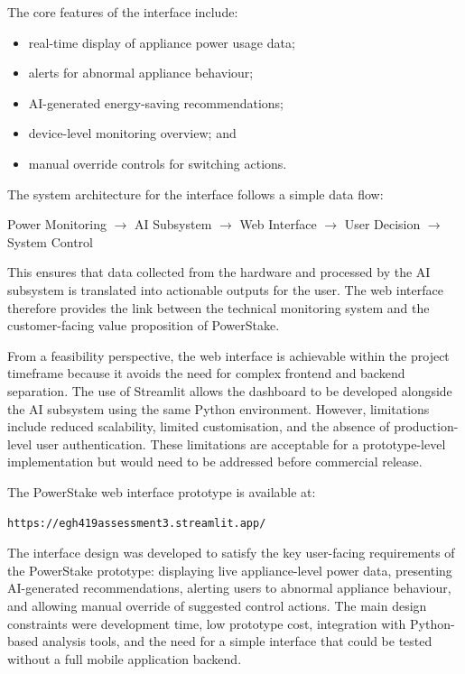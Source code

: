\documentclass[11pt, twoside, a4paper]{article}
\begin{document}
The core features of the interface include:
\begin{itemize}
    \item real-time display of appliance power usage data;
    \item alerts for abnormal appliance behaviour;
    \item AI-generated energy-saving recommendations;
    \item device-level monitoring overview; and
    \item manual override controls for switching actions.
\end{itemize}

The system architecture for the interface follows a simple data flow:

\begin{center}
Power Monitoring \(\rightarrow\) AI Subsystem \(\rightarrow\) Web Interface \(\rightarrow\) User Decision \(\rightarrow\) System Control
\end{center}

This ensures that data collected from the hardware and processed by the AI subsystem is translated into actionable outputs for the user. The web interface therefore provides the link between the technical monitoring system and the customer-facing value proposition of PowerStake.

From a feasibility perspective, the web interface is achievable within the project timeframe because it avoids the need for complex frontend and backend separation. The use of Streamlit allows the dashboard to be developed alongside the AI subsystem using the same Python environment. However, limitations include reduced scalability, limited customisation, and the absence of production-level user authentication. These limitations are acceptable for a prototype-level implementation but would need to be addressed before commercial release.

The PowerStake web interface prototype is available at:

\begin{center}
\texttt{https://egh419assessment3.streamlit.app/}
\end{center}
The interface design was developed to satisfy the key user-facing requirements of the PowerStake prototype: displaying live appliance-level power data, 
presenting AI-generated recommendations, alerting users to abnormal appliance behaviour, and allowing manual override of suggested control actions. 
The main design constraints were development time, low prototype cost, integration with Python-based analysis tools, and the need for a simple interface 
that could be tested without a full mobile application backend.
\end{document}
